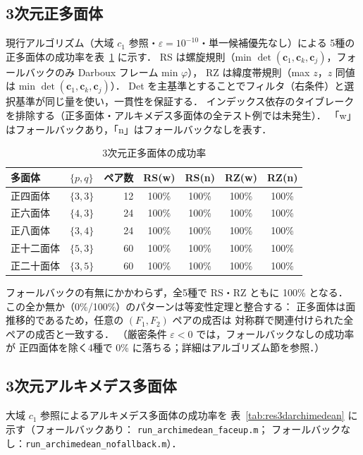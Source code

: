 \documentclass[12pt,a4paper]{article}
\theoremstyle{definition}
\begin{document}
\subsection{3次元正多面体}
\label{ssec:res3dplatonic}

現行アルゴリズム（大域 $c_1$ 参照・$\varepsilon = 10^{-10}$・単一候補優先なし）による
5種の正多面体の成功率を表~\ref{tab:res3dplatonic} に示す．
RS は螺旋規則（min $\det(\mathbf{c}_1,\mathbf{c}_k,\mathbf{c}_j)$，フォールバックのみ Darboux フレーム min $\varphi$），
RZ は緯度帯規則（max $z$，$z$ 同値は min $\det(\mathbf{c}_1,\mathbf{c}_k,\mathbf{c}_j)$）．
Det を主基準とすることでフィルタ（右条件）と選択基準が同じ量を使い，一貫性を保証する．
インデックス依存のタイブレークを排除する（正多面体・アルキメデス多面体の全テスト例では未発生）．
「w」はフォールバックあり，「n」はフォールバックなしを表す．

\begin{table}[h]
\centering
\caption{3次元正多面体の成功率}
\label{tab:res3dplatonic}
\begin{tabular}{llrcccc}
\toprule
多面体 & $\{p,q\}$ & ペア数 & RS(w) & RS(n) & RZ(w) & RZ(n) \\
\midrule
正四面体  & $\{3,3\}$ & 12 & 100\% & 100\% & 100\% & 100\% \\
正六面体  & $\{4,3\}$ & 24 & 100\% & 100\% & 100\% & 100\% \\
正八面体  & $\{3,4\}$ & 24 & 100\% & 100\% & 100\% & 100\% \\
正十二面体 & $\{5,3\}$ & 60 & 100\% & 100\% & 100\% & 100\% \\
正二十面体 & $\{3,5\}$ & 60 & 100\% & 100\% & 100\% & 100\% \\
\bottomrule
\end{tabular}
\end{table}

\noindent
フォールバックの有無にかかわらず，全5種で RS・RZ ともに 100\% となる．
この全か無か（0\%/100\%）のパターンは等変性定理と整合する：
正多面体は面推移的であるため，任意の $(F_1, F_2)$ ペアの成否は
対称群で関連付けられた全ペアの成否と一致する．
（厳密条件 $\varepsilon<0$ では，フォールバックなしの成功率が
正四面体を除く4種で 0\% に落ちる；詳細はアルゴリズム節を参照．）

\subsection{3次元アルキメデス多面体}
\label{ssec:res3darchimedean}

大域 $c_1$ 参照によるアルキメデス多面体の成功率を
表~\ref{tab:res3darchimedean} に示す（フォールバックあり：
\texttt{run\_archi\-medean\_faceup.m}；
フォールバックなし：\texttt{run\_archi\-medean\_nofallback.m}）．
\end{document}
